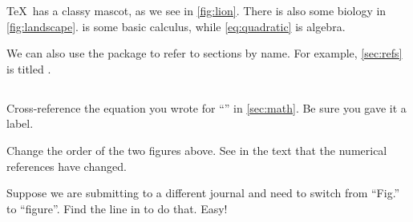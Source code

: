 \documentclass{article}
\begin{document}
\TeX\ has a classy mascot, as we see in \cref{fig:lion}.
There is also some biology in \cref{fig:landscape}.
 is some basic calculus, while \cref{eq:quadratic} is algebra.

We can also use the  package to refer to sections by name.
For example, \cref{sec:refs} is titled .

\subsection*{\task}

Cross-reference the equation you wrote for ``\task'' in \cref{sec:math}.
Be sure you gave it a label.

Change the order of the two figures above.
See in the text that the numerical references have changed.

Suppose we are submitting to a different journal and need to switch from ``Fig.'' to ``figure''.
Find the line in  to do that.  Easy!
\end{document}
